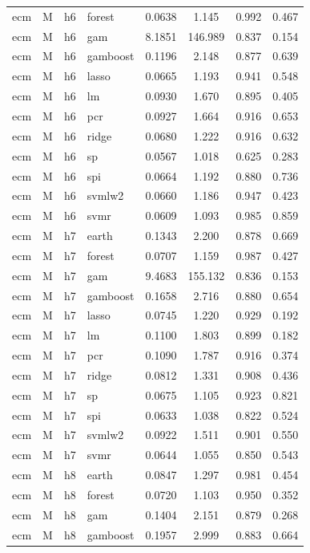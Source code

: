 \begin{ThreePartTable}
\begin{longtable}[t]{llclcccc}
ecm & M & h6 & forest & 0.0638 & 1.145 & 0.992 & 0.467\\
ecm & M & h6 & gam & 8.1851 & 146.989 & 0.837 & 0.154\\
ecm & M & h6 & gamboost & 0.1196 & 2.148 & 0.877 & 0.639\\
ecm & M & h6 & lasso & 0.0665 & 1.193 & 0.941 & 0.548\\
ecm & M & h6 & lm & 0.0930 & 1.670 & 0.895 & 0.405\\
ecm & M & h6 & pcr & 0.0927 & 1.664 & 0.916 & 0.653\\
ecm & M & h6 & ridge & 0.0680 & 1.222 & 0.916 & 0.632\\
ecm & M & h6 & sp & 0.0567 & 1.018 & 0.625 & 0.283\\
ecm & M & h6 & spi & 0.0664 & 1.192 & 0.880 & 0.736\\
ecm & M & h6 & svmlw2 & 0.0660 & 1.186 & 0.947 & 0.423\\
ecm & M & h6 & svmr & 0.0609 & 1.093 & 0.985 & 0.859\\
\addlinespace
ecm & M & h7 & earth & 0.1343 & 2.200 & 0.878 & 0.669\\
ecm & M & h7 & forest & 0.0707 & 1.159 & 0.987 & 0.427\\
ecm & M & h7 & gam & 9.4683 & 155.132 & 0.836 & 0.153\\
ecm & M & h7 & gamboost & 0.1658 & 2.716 & 0.880 & 0.654\\
ecm & M & h7 & lasso & 0.0745 & 1.220 & 0.929 & 0.192\\
ecm & M & h7 & lm & 0.1100 & 1.803 & 0.899 & 0.182\\
ecm & M & h7 & pcr & 0.1090 & 1.787 & 0.916 & 0.374\\
ecm & M & h7 & ridge & 0.0812 & 1.331 & 0.908 & 0.436\\
ecm & M & h7 & sp & 0.0675 & 1.105 & 0.923 & 0.821\\
ecm & M & h7 & spi & 0.0633 & 1.038 & 0.822 & 0.524\\
ecm & M & h7 & svmlw2 & 0.0922 & 1.511 & 0.901 & 0.550\\
ecm & M & h7 & svmr & 0.0644 & 1.055 & 0.850 & 0.543\\
\addlinespace
ecm & M & h8 & earth & 0.0847 & 1.297 & 0.981 & 0.454\\
ecm & M & h8 & forest & 0.0720 & 1.103 & 0.950 & 0.352\\
ecm & M & h8 & gam & 0.1404 & 2.151 & 0.879 & 0.268\\
ecm & M & h8 & gamboost & 0.1957 & 2.999 & 0.883 & 0.664\\

\end{longtable}
\end{ThreePartTable}
